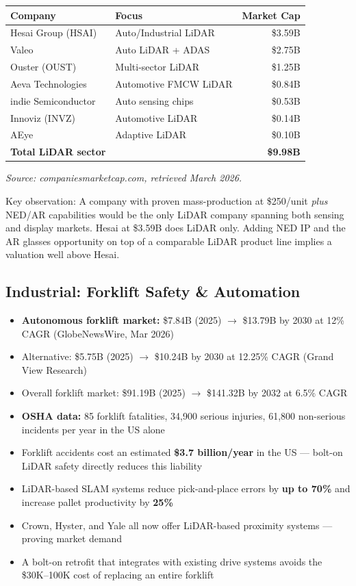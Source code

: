 \documentclass[11pt,letterpaper]{article}
\begin{document}
\begin{center}
\begin{tabular}{@{}llr@{}}
\toprule
\textbf{Company} & \textbf{Focus} & \textbf{Market Cap} \\
\midrule
Hesai Group (HSAI) & Auto/Industrial LiDAR & \$3.59B \\
Valeo & Auto LiDAR + ADAS & \$2.75B \\
Ouster (OUST) & Multi-sector LiDAR & \$1.25B \\
Aeva Technologies & Automotive FMCW LiDAR & \$0.84B \\
indie Semiconductor & Auto sensing chips & \$0.53B \\
Innoviz (INVZ) & Automotive LiDAR & \$0.14B \\
AEye & Adaptive LiDAR & \$0.10B \\
\midrule
\textbf{Total LiDAR sector} & & \textbf{\$9.98B} \\
\bottomrule
\end{tabular}
\end{center}

{\small\textit{Source: companiesmarketcap.com, retrieved March 2026.}

Key observation: A company with proven mass-production at \$250/unit \textit{plus} NED/AR capabilities would be the only LiDAR company spanning both sensing and display markets. Hesai at \$3.59B does LiDAR only. Adding NED IP and the AR glasses opportunity on top of a comparable LiDAR product line implies a valuation well above Hesai.}

\subsection{Industrial: Forklift Safety \& Automation}

\begin{itemize}
\item \textbf{Autonomous forklift market:} \$7.84B (2025) $\rightarrow$ \$13.79B by 2030 at 12\% CAGR (GlobeNewsWire, Mar 2026)
\item Alternative: \$5.75B (2025) $\rightarrow$ \$10.24B by 2030 at 12.25\% CAGR (Grand View Research)
\item Overall forklift market: \$91.19B (2025) $\rightarrow$ \$141.32B by 2032 at 6.5\% CAGR
\item \textbf{OSHA data:} 85 forklift fatalities, 34,900 serious injuries, 61,800 non-serious incidents per year in the US alone
\item Forklift accidents cost an estimated \textbf{\$3.7 billion/year} in the US --- bolt-on LiDAR safety directly reduces this liability
\item LiDAR-based SLAM systems reduce pick-and-place errors by \textbf{up to 70\%} and increase pallet productivity by \textbf{25\%}
\item Crown, Hyster, and Yale all now offer LiDAR-based proximity systems --- proving market demand
\item A bolt-on retrofit that integrates with existing drive systems avoids the \$30K--100K cost of replacing an entire forklift
\end{itemize}
\end{document}
